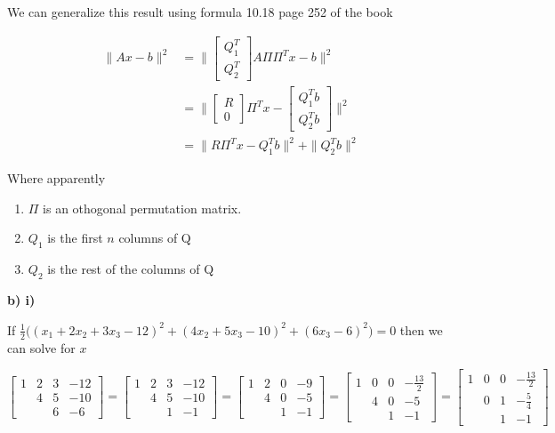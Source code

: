 We can generalize this result using formula 10.18 page 252 of the book

\begin{align*}
	\|Ax -b\|^2 &= \|\begin{bmatrix}
		Q_1^T \\ Q_2^T
	\end{bmatrix} A \Pi \Pi^Tx-b \|^2 \\
	&= \|\begin{bmatrix}
		R \\ 0
	\end{bmatrix} \Pi^Tx-\begin{bmatrix}
		Q_1^Tb \\ Q_2^Tb
	\end{bmatrix} \|^2 \\
	&= \| R\Pi^Tx-Q_1^Tb\|^2 + \|Q_2^Tb\|^2
\end{align*}

Where apparently 
\begin{enumerate}
\item $\Pi$ is an othogonal permutation matrix.
\item $Q_1$ is the first $n$ columns of Q
\item $Q_2$ is the rest of the columns of Q
\end{enumerate}

\textbf{b) i)}

\answer

If $\frac{1}{2} \Bigg( (x_1 + 2x_2 + 3x_3 - 12)^2 + (4x_2 + 5x_3 -10)^2 + (6x_3 - 6)^2  \Bigg) = 0$ then we can solve for $x$

\[
\begin{bmatrix}
1 & 2 & 3 & -12 \\
& 4 & 5 & -10 \\
& & 6 & -6
\end{bmatrix} =
\begin{bmatrix}
1 & 2 & 3 & -12 \\
& 4 & 5 & -10 \\
& & 1 & -1
\end{bmatrix} =
\begin{bmatrix}
1 & 2 & 0 & -9 \\
& 4 & 0 & -5 \\
& & 1 & -1
\end{bmatrix} =
\begin{bmatrix}
1 & 0 & 0 & -\frac{13}{2} \\
& 4 & 0 & -5 \\
& & 1 & -1
\end{bmatrix} =
\begin{bmatrix}
1 & 0 & 0 & -\frac{13}{2} \\
& 0 & 1 & -\frac{5}{4} \\
& & 1 & -1
\end{bmatrix}
\]

